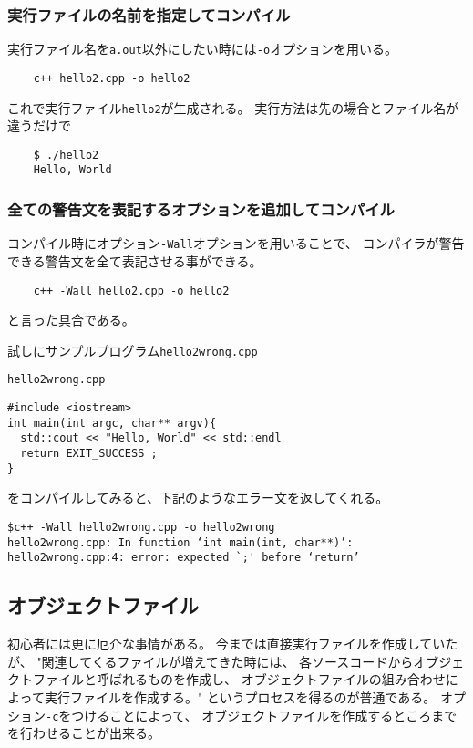    
   \subsubsection*{実行ファイルの名前を指定してコンパイル}
   実行ファイル名を\texttt{a.out}以外にしたい時には\verb|-o|オプションを用いる。
   \begin{verbatim}
	c++ hello2.cpp -o hello2
   \end{verbatim}
   これで実行ファイル\texttt{hello2}が生成される。
   実行方法は先の場合とファイル名が違うだけで
   \begin{verbatim}
	$ ./hello2
	Hello, World
   \end{verbatim}
   
   
   
   \subsubsection*{全ての警告文を表記するオプションを追加してコンパイル}
   コンパイル時にオプション\verb|-Wall|オプションを用いることで、
   コンパイラが警告できる警告文を全て表記させる事ができる。
   \begin{verbatim}
	c++ -Wall hello2.cpp -o hello2
   \end{verbatim}
   と言った具合である。
   
   試しにサンプルプログラム\texttt{hello2wrong.cpp}
  \begin{itembox}{\texttt{hello2wrong.cpp}}
\begin{verbatim}
#include <iostream>
int main(int argc, char** argv){
  std::cout << "Hello, World" << std::endl
  return EXIT_SUCCESS ;
}
\end{verbatim}
  \end{itembox}
  をコンパイルしてみると、下記のようなエラー文を返してくれる。
\begin{verbatim}
$c++ -Wall hello2wrong.cpp -o hello2wrong
hello2wrong.cpp: In function ‘int main(int, char**)’:
hello2wrong.cpp:4: error: expected `;' before ‘return’	
\end{verbatim}




\subsection{オブジェクトファイル}
初心者には更に厄介な事情がある。
今までは直接実行ファイルを作成していたが、
"関連してくるファイルが増えてきた時には、
各ソースコードからオブジェクトファイルと呼ばれるものを作成し、
オブジェクトファイルの組み合わせによって実行ファイルを作成する。"
というプロセスを得るのが普通である。
オプション\verb|-c|をつけることによって、
オブジェクトファイルを作成するところまでを行わせることが出来る。